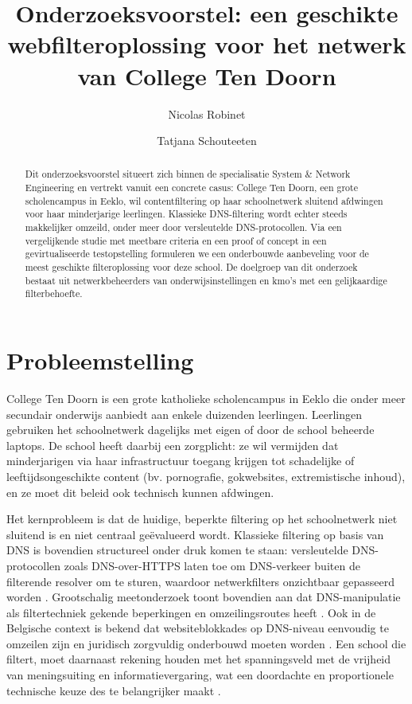 \documentclass{hogent-article}
\title{Onderzoeksvoorstel: een geschikte webfilteroplossing voor het netwerk van College Ten Doorn}
\author{Nicolas Robinet} \email{nicolas.robinet@student.hogent.be}
\author{Tatjana Schouteeten} \email{tatjana.schouteeten@student.hogent.be}
\begin{document}
\begin{abstract}
    Dit onderzoeksvoorstel situeert zich binnen de specialisatie System \& Network Engineering en vertrekt vanuit een concrete casus: College Ten Doorn, een grote scholencampus in Eeklo, wil contentfiltering op haar schoolnetwerk sluitend afdwingen voor haar minderjarige leerlingen. Klassieke DNS-filtering wordt echter steeds makkelijker omzeild, onder meer door versleutelde DNS-protocollen. Via een vergelijkende studie met meetbare criteria en een proof of concept in een gevirtualiseerde testopstelling formuleren we een onderbouwde aanbeveling voor de meest geschikte filteroplossing voor deze school. De doelgroep van dit onderzoek bestaat uit netwerkbeheerders van onderwijsinstellingen en kmo's met een gelijkaardige filterbehoefte.
\end{abstract}

\tableofcontents

\section{Probleemstelling}
College Ten Doorn is een grote katholieke scholencampus in Eeklo die onder meer secundair onderwijs aanbiedt aan enkele duizenden leerlingen. Leerlingen gebruiken het schoolnetwerk dagelijks met eigen of door de school beheerde laptops. De school heeft daarbij een zorgplicht: ze wil vermijden dat minderjarigen via haar infrastructuur toegang krijgen tot schadelijke of leeftijdsongeschikte content (bv. pornografie, gokwebsites, extremistische inhoud), en ze moet dit beleid ook technisch kunnen afdwingen.

Het kernprobleem is dat de huidige, beperkte filtering op het schoolnetwerk niet sluitend is en niet centraal geëvalueerd wordt. Klassieke filtering op basis van DNS is bovendien structureel onder druk komen te staan: versleutelde DNS-protocollen zoals DNS-over-HTTPS laten toe om DNS-verkeer buiten de filterende resolver om te sturen, waardoor netwerkfilters onzichtbaar gepasseerd worden \autocite{Hoffman2018}. Grootschalig meetonderzoek toont bovendien aan dat DNS-manipulatie als filtertechniek gekende beperkingen en omzeilingsroutes heeft \autocite{Pearce2017}. Ook in de Belgische context is bekend dat websiteblokkades op DNS-niveau eenvoudig te omzeilen zijn en juridisch zorgvuldig onderbouwd moeten worden \autocite{Royer2019}. Een school die filtert, moet daarnaast rekening houden met het spanningsveld met de vrijheid van meningsuiting en informatievergaring, wat een doordachte en proportionele technische keuze des te belangrijker maakt \autocite{Ombelet2015}.
\end{document}
